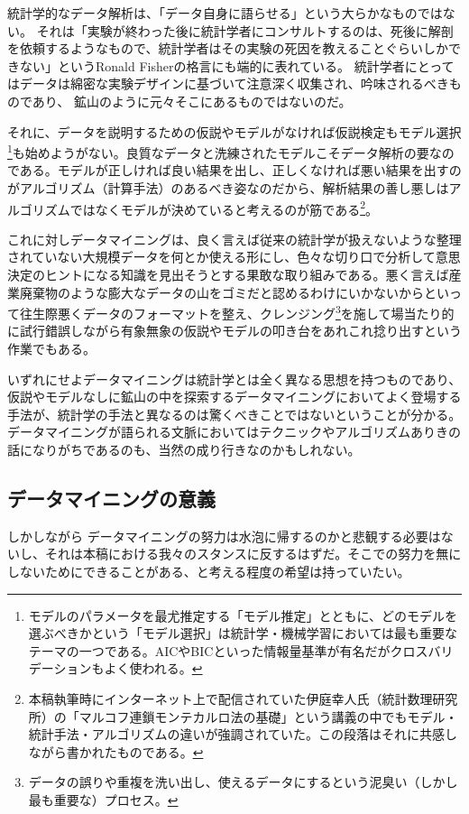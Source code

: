 統計学的なデータ解析は、「データ自身に語らせる」という大らかなものではない。
それは「実験が終わった後に統計学者にコンサルトするのは、死後に解剖を依頼するようなもので、統計学者はその実験の死因を教えることぐらいしかできない」というRonald Fisherの格言にも端的に表れている。
統計学者にとってはデータは綿密な実験デザインに基づいて注意深く収集され、吟味されるべきものであり、
鉱山のように元々そこにあるものではないのだ。

それに、データを説明するための仮説やモデルがなければ仮説検定もモデル選択\footnote{モデルのパラメータを最尤推定する「モデル推定」とともに、どのモデルを選ぶべきかという「モデル選択」は統計学・機械学習においては最も重要なテーマの一つである。AICやBICといった情報量基準が有名だがクロスバリデーションもよく使われる。}も始めようがない。良質なデータと洗練されたモデルこそデータ解析の要なのである。モデルが正しければ良い結果を出し、正しくなければ悪い結果を出すのがアルゴリズム（計算手法）のあるべき姿なのだから、解析結果の善し悪しはアルゴリズムではなくモデルが決めていると考えるのが筋である\footnote{本稿執筆時にインターネット上で配信されていた伊庭幸人氏（統計数理研究所）の「マルコフ連鎖モンテカルロ法の基礎」という講義の中でもモデル・統計手法・アルゴリズムの違いが強調されていた。この段落はそれに共感しながら書かれたものである。}。

これに対しデータマイニングは、良く言えば従来の統計学が扱えないような整理されていない大規模データを何とか使える形にし、色々な切り口で分析して意思決定のヒントになる知識を見出そうとする果敢な取り組みである。悪く言えば産業廃棄物のような膨大なデータの山をゴミだと認めるわけにいかないからといって往生際悪くデータのフォーマットを整え、クレンジング\footnote{データの誤りや重複を洗い出し、使えるデータにするという泥臭い（しかし最も重要な）プロセス。}を施して場当たり的に試行錯誤しながら有象無象の仮説やモデルの叩き台をあれこれ捻り出すという作業でもある。

いずれにせよデータマイニングは統計学とは全く異なる思想を持つものであり、仮説やモデルなしに鉱山の中を探索するデータマイニングにおいてよく登場する手法が、統計学の手法と異なるのは驚くべきことではないということが分かる。データマイニングが語られる文脈においてはテクニックやアルゴリズムありきの話になりがちであるのも、当然の成り行きなのかもしれない。

\subsection{データマイニングの意義}
しかしながら
データマイニングの努力は水泡に帰するのかと悲観する必要はないし、それは本稿における我々のスタンスに反するはずだ。そこでの努力を無にしないためにできることがある、と考える程度の希望は持っていたい。

